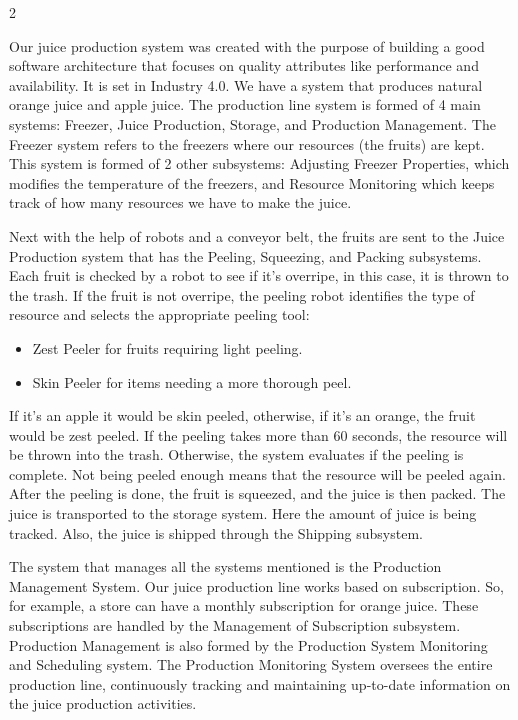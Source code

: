 \documentclass{article}
\begin{document}
\begin{multicols}{2}


\color{black}

Our juice production system was created with the purpose of building a good software architecture that focuses on quality attributes like performance and availability. It is set in Industry 4.0. We have a system that produces natural orange juice and apple juice. The production line system is formed of 4 main systems: Freezer, Juice Production, Storage, and Production Management. The Freezer system refers to the freezers where our resources (the fruits) are kept. 
This system is formed of 2 other subsystems: Adjusting Freezer Properties, which modifies the temperature of the freezers, and Resource Monitoring which keeps track of how many resources we have to make the juice. 

Next with the help of robots and a conveyor belt, the fruits are sent to the Juice Production system that has the Peeling, Squeezing, and Packing subsystems. Each fruit is checked by a robot to see if it’s overripe, in this case, it is thrown to the trash. If the fruit is not overripe, the peeling robot identifies the type of resource and selects the appropriate peeling tool:\begin{itemize}
    \item Zest Peeler for fruits requiring light peeling.
    \item Skin Peeler for items needing a more thorough peel.
\end{itemize}
 If it’s an apple it would be skin peeled, otherwise, if it’s an orange, the fruit would be zest peeled. If the peeling takes more than 60 seconds, the resource will be thrown into the trash. Otherwise, the system evaluates if the peeling is complete. Not being peeled enough means that the resource will be peeled again. After the peeling is done, the fruit is squeezed, and the juice is then packed. The juice is transported to the storage system. Here the amount of juice is being tracked. Also, the juice is shipped through the Shipping subsystem. 
 
The system that manages all the systems mentioned is the Production Management System. Our juice production line works based on subscription. So, for example, a store can have a monthly subscription for orange juice. These subscriptions are handled by the Management of Subscription subsystem. Production Management is also formed by the Production System Monitoring and Scheduling system. The Production Monitoring System oversees the entire production line, continuously tracking and maintaining up-to-date information on the juice production activities. 




\end{multicols}
\end{document}
